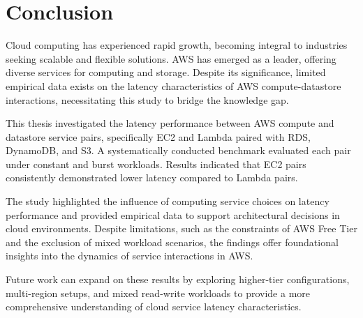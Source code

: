 \section{Conclusion}
\label{cha:conclusion}

Cloud computing has experienced rapid growth, becoming integral to industries seeking scalable and flexible solutions. AWS has emerged as a leader, offering diverse services for computing and storage. Despite its significance, limited empirical data exists on the latency characteristics of AWS compute-datastore interactions, necessitating this study to bridge the knowledge gap.

This thesis investigated the latency performance between AWS compute and datastore service pairs, specifically EC2 and Lambda paired with RDS, DynamoDB, and S3. A systematically conducted benchmark evaluated each pair under constant and burst workloads. Results indicated that EC2 pairs consistently demonstrated lower latency compared to Lambda pairs.

The study highlighted the influence of computing service choices on latency performance and provided empirical data to support architectural decisions in cloud environments. Despite limitations, such as the constraints of AWS Free Tier and the exclusion of mixed workload scenarios, the findings offer foundational insights into the dynamics of service interactions in AWS.

Future work can expand on these results by exploring higher-tier configurations, multi-region setups, and mixed read-write workloads to provide a more comprehensive understanding of cloud service latency characteristics.

